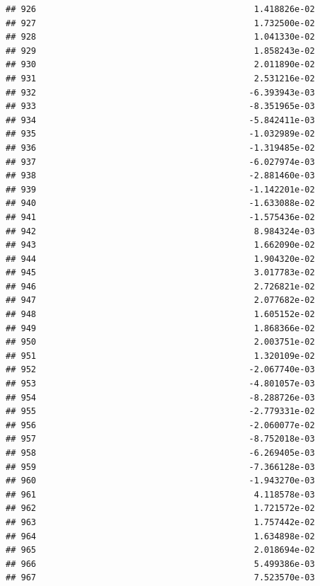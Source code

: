 \documentclass[
]{article}
\begin{document}
\begin{verbatim}
## 926                                           1.418826e-02
## 927                                           1.732500e-02
## 928                                           1.041330e-02
## 929                                           1.858243e-02
## 930                                           2.011890e-02
## 931                                           2.531216e-02
## 932                                          -6.393943e-03
## 933                                          -8.351965e-03
## 934                                          -5.842411e-03
## 935                                          -1.032989e-02
## 936                                          -1.319485e-02
## 937                                          -6.027974e-03
## 938                                          -2.881460e-03
## 939                                          -1.142201e-02
## 940                                          -1.633088e-02
## 941                                          -1.575436e-02
## 942                                           8.984324e-03
## 943                                           1.662090e-02
## 944                                           1.904320e-02
## 945                                           3.017783e-02
## 946                                           2.726821e-02
## 947                                           2.077682e-02
## 948                                           1.605152e-02
## 949                                           1.868366e-02
## 950                                           2.003751e-02
## 951                                           1.320109e-02
## 952                                          -2.067740e-03
## 953                                          -4.801057e-03
## 954                                          -8.288726e-03
## 955                                          -2.779331e-02
## 956                                          -2.060077e-02
## 957                                          -8.752018e-03
## 958                                          -6.269405e-03
## 959                                          -7.366128e-03
## 960                                          -1.943270e-03
## 961                                           4.118578e-03
## 962                                           1.721572e-02
## 963                                           1.757442e-02
## 964                                           1.634898e-02
## 965                                           2.018694e-02
## 966                                           5.499386e-03
## 967                                           7.523570e-03

\end{verbatim}
\end{document}
